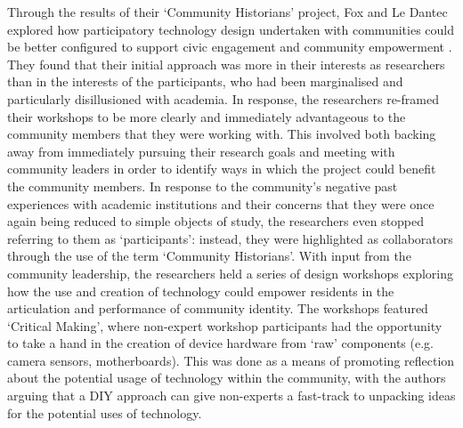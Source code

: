 Through the results of their `Community Historians' project, Fox and Le Dantec explored how participatory technology design undertaken with communities could be better configured to support civic engagement and community empowerment \citep{Fox2014}. They found that their initial approach was more in their interests as researchers than in the interests of the participants, who had been marginalised and particularly disillusioned with academia. In response, the researchers re-framed their workshops to be more clearly and immediately advantageous to the community members that they were working with. This involved both backing away from immediately pursuing their research goals and meeting with community leaders in order to identify ways in which the project could benefit the community members. In response to the community's negative past experiences with academic institutions and their concerns that they were once again being reduced to simple objects of study, the researchers even stopped referring to them as `participants': instead, they were highlighted as collaborators through the use of the term `Community Historians'. With input from the community leadership, the researchers held a series of design workshops exploring how the use and creation of technology could empower residents in the articulation and performance of community identity. The workshops featured `Critical Making', where non-expert workshop participants had the opportunity to take a hand in the creation of device hardware from `raw' components (e.g. camera sensors, motherboards). This was done as a means of promoting reflection about the potential usage of technology within the community, with the authors arguing that a DIY approach can give non-experts a fast-track to unpacking ideas for the potential uses of technology. 

